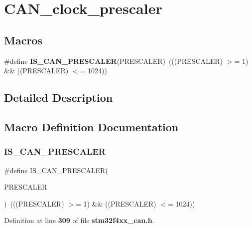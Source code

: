 \section{C\+A\+N\+\_\+clock\+\_\+prescaler}
\label{group__CAN__clock__prescaler}
\subsection*{Macros}
\begin{DoxyCompactItemize}
\item 
\#define \textbf{ I\+S\+\_\+\+C\+A\+N\+\_\+\+P\+R\+E\+S\+C\+A\+L\+ER}(P\+R\+E\+S\+C\+A\+L\+ER)~(((P\+R\+E\+S\+C\+A\+L\+ER) $>$= 1) \&\& ((P\+R\+E\+S\+C\+A\+L\+ER) $<$= 1024))
\end{DoxyCompactItemize}


\subsection{Detailed Description}


\subsection{Macro Definition Documentation}
\mbox{\label{group__CAN__clock__prescaler_gacde6b8be6fe083a6302fc183b5ac1055}} 
\subsubsection{I\+S\+\_\+\+C\+A\+N\+\_\+\+P\+R\+E\+S\+C\+A\+L\+ER}
{\footnotesize\ttfamily \#define I\+S\+\_\+\+C\+A\+N\+\_\+\+P\+R\+E\+S\+C\+A\+L\+ER(\begin{DoxyParamCaption}\item[{}]{P\+R\+E\+S\+C\+A\+L\+ER }\end{DoxyParamCaption})~(((P\+R\+E\+S\+C\+A\+L\+ER) $>$= 1) \&\& ((P\+R\+E\+S\+C\+A\+L\+ER) $<$= 1024))}



Definition at line \textbf{ 309} of file \textbf{ stm32f4xx\+\_\+can.\+h}.

